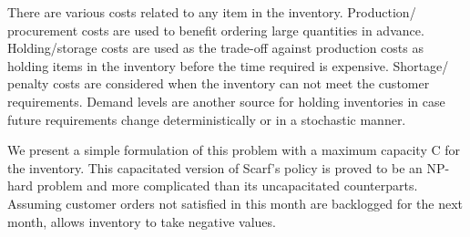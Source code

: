 There are various costs related to any item in the inventory. Production/ procurement costs are used to benefit ordering large quantities in advance. Holding/storage costs are used as the trade-off against production costs as holding items in the inventory before the time required is expensive. Shortage/ penalty costs are considered when the inventory can not meet the customer requirements. Demand levels are another source for holding inventories in case future requirements change deterministically or in a stochastic manner. 
% 
%
%


We present a simple formulation of this problem with a maximum capacity C for the inventory. This capacitated version of Scarf's policy is proved to be an NP-hard problem \cite{bitran} and more complicated than its uncapacitated counterparts. Assuming customer orders not satisfied in this month are backlogged for the next month, allows inventory to take negative values. 

